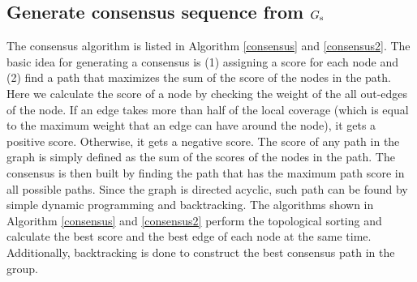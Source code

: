 \documentclass[11pt]{article}
\begin{document}
\subsection{Generate consensus sequence from $G_{\rm s}$}

The consensus algorithm is listed in Algorithm \ref{consensus} and \ref{consensus2}. The basic idea for generating a consensus is (1) assigning a score for each node and (2) find a path that maximizes the sum of the score of the nodes in the path. Here we calculate the score of a node by checking the weight of the all out-edges of the node. If an edge takes more than half of the local coverage (which is equal to the maximum weight that an edge can have around the node), it gets a positive score. Otherwise, it gets a negative score. The score of any path in the graph is simply defined as the sum of the scores of the nodes in the path. The consensus is then built by finding the path that has the maximum path score in all possible paths. Since the graph is directed acyclic, such path can be found by simple dynamic programming and backtracking. The algorithms shown in Algorithm \ref{consensus} and \ref{consensus2} perform the topological sorting and calculate the best score and the best edge of each node at the same time. Additionally, backtracking is done to construct the best consensus path in the group. 
\end{document}
